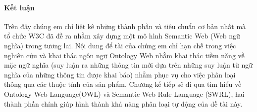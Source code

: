 \paragraph{Kết luận} Trên đây chúng em chỉ liệt kê những thành phần và tiêu chuẩn cơ bản nhất mà tổ chức W3C đã đề ra nhằm xây dựng một mô hình Semantic Web (Web ngữ nghĩa) trong tương lai. Nội dung để tài của chúng em chỉ hạn chế trong việc nghiên cứu và khai thác ngôn ngữ Ontology Web nhằm khai thác tiềm năng về mặc ngữ nghĩa (suy luận ra những thông tin mới dựa trên những suy luận từ ngữ nghĩa của những thông tin được khai báo) nhằm phục vụ cho việc phân loại thông qua các thuộc tính của sản phẩm. Chương kế tiếp sẽ đi qua tìm hiểu về Ontology Web Language(OWL) và Semantic Web Rule Language (SWRL), hai thành phần chính giúp hình thành khả năng phân loại tự động của đề tài này.






